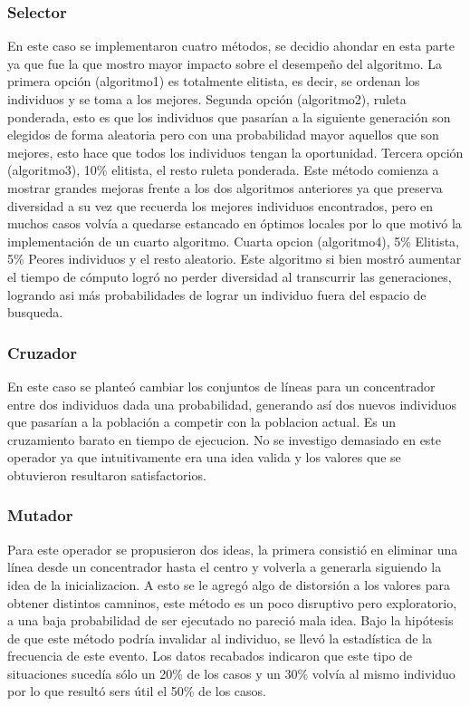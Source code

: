 \documentclass{extarticle}
\begin{document}
\subsubsection*{Selector}
En este caso se implementaron cuatro métodos, se decidio ahondar en esta parte ya que fue la que mostro mayor impacto sobre el desempeño del algoritmo.
La primera opción (algoritmo1) es totalmente elitista, es decir, se ordenan los individuos y se toma a los mejores.
Segunda opción (algoritmo2), ruleta ponderada, esto es que los individuos que pasarían a la siguiente generación son elegidos de forma aleatoria pero con una probabilidad mayor aquellos que son mejores, esto hace que todos los individuos tengan la oportunidad.
Tercera opción (algoritmo3), 10\% elitista, el resto ruleta ponderada. Este método comienza a mostrar grandes mejoras frente a los dos algoritmos anteriores ya que preserva diversidad a su vez que recuerda los mejores individuos encontrados, pero en muchos casos volvía a quedarse estancado en óptimos locales por lo que motivó la implementación de un cuarto algoritmo.
Cuarta opcion (algoritmo4), 5\% Elitista, 5\% Peores individuos y el resto aleatorio. Este algoritmo si bien mostró aumentar el tiempo de cómputo logró no perder diversidad al transcurrir las generaciones, logrando asi más probabilidades de lograr un individuo fuera del espacio de busqueda.

\subsubsection*{Cruzador}
En este caso se planteó cambiar los conjuntos de líneas para un concentrador entre dos individuos dada una probabilidad, generando así dos nuevos individuos que pasarían a la población a competir con la poblacion actual. Es un cruzamiento barato en tiempo de ejecucion. No se investigo demasiado en este operador ya que intuitivamente era una idea valida y los valores que se obtuvieron resultaron satisfactorios.

\subsubsection*{Mutador}
Para este operador se propusieron dos ideas, la primera consistió en eliminar una línea desde un concentrador hasta el centro y volverla a generarla siguiendo la idea de la inicializacion. A esto se le agregó algo de distorsión a los valores para obtener distintos camninos, este método es un poco disruptivo pero exploratorio, a una baja probabilidad de ser ejecutado no pareció mala idea. Bajo la hipótesis de que este método podría invalidar al individuo, se llevó la estadística de la frecuencia de este evento. Los datos recabados indicaron que este tipo de situaciones sucedía sólo un 20\% de los casos y un 30\% volvía al mismo individuo por lo que resultó sers útil el 50\% de los casos. 
\end{document}
